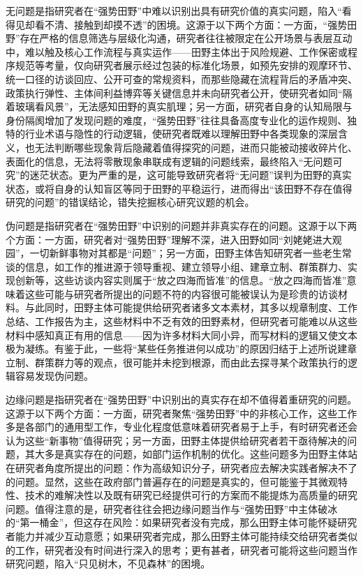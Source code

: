 \documentclass[12pt,a4paper]{article}
\begin{document}
无问题是指研究者在“强势田野”中难以识别出具有研究价值的真实问题，陷入“看得见却看不清、接触到却摸不透”的困境。这源于以下两个方面：一方面，“强势田野”存在严格的信息筛选与层级化沟通，研究者往往被限定在公开场景与表层互动中，难以触及核心工作流程与真实运作——田野主体出于风险规避、工作保密或程序规范等考量，仅向研究者展示经过包装的标准化场景，如预先安排的观摩环节、统一口径的访谈回应、公开可查的常规资料，而那些隐藏在流程背后的矛盾冲突、政策执行弹性、主体间利益博弈等关键信息并未向研究者公开，使研究者如同“隔着玻璃看风景”，无法感知田野的真实肌理；另一方面，研究者自身的认知局限与身份隔阂增加了发现问题的难度，“强势田野”往往具备高度专业化的运作规则、独特的行业术语与隐性的行动逻辑，使研究者既难以理解田野中各类现象的深层含义，也无法判断哪些现象背后隐藏着值得探究的问题，进而只能被动接收碎片化、表面化的信息，无法将零散现象串联成有逻辑的问题线索，最终陷入“无问题可究”的迷茫状态。更为严重的是，这可能导致研究者将“无问题”误判为田野的真实状态，或将自身的认知盲区等同于田野的平稳运行，进而得出“该田野不存在值得研究的问题”的错误结论，错失挖掘核心研究议题的机会。



伪问题是指研究者在“强势田野”中识别的问题并非真实存在的问题。这源于以下两个方面：一方面，研究者对“强势田野”理解不深，进入田野如同“刘姥姥进大观园”，一切新鲜事物对其都是“问题”；另一方面，田野主体告知研究者一些老生常谈的信息，如工作的推进源于领导重视、建立领导小组、建章立制、群策群力、实现创新等，这些访谈内容实则属于“放之四海而皆准”的信息。“放之四海而皆准”意味着这些可能与研究者所提出的问题不符的内容很可能被误认为是珍贵的访谈材料。与此同时，田野主体可能提供给研究者诸多文本素材，其多以规章制度、工作总结、工作报告为主，这些材料中不乏有效的田野素材，但研究者可能难以从这些材料中感知真正有用的信息——因为许多材料大同小异，而写材料的逻辑又使文本极为凝练。有鉴于此，一些将“某些任务推进何以成功”的原因归结于上述所说建章立制、群策群力等的观点，很可能并未挖到根源，而由此去探寻某个政策执行的逻辑容易发现伪问题。



边缘问题是指研究者在“强势田野”中识别出的真实存在却不值得着重研究的问题。这源于以下两个方面：一方面，研究者聚焦“强势田野”中的非核心工作，这些工作多是各部门的通用型工作，专业化程度低意味着研究者易于上手，有时研究者还会认为这些“新事物”值得研究；另一方面，田野主体提供给研究者若干亟待解决的问题，其大多是真实存在的问题，如部门运作机制的优化。这些问题多为田野主体站在研究者角度所提出的问题：作为高级知识分子，研究者应去解决实践者解决不了的问题。显然，这些在政府部门普遍存在的问题是真实的，但可能鉴于其微观特性、技术的难解决性以及既有研究已经提供可行的方案而不能提炼为高质量的研究问题。值得注意的是，研究者往往会把边缘问题当作与“强势田野”中主体破冰的“第一桶金”，但这存在风险：如果研究者没有完成，那么田野主体可能怀疑研究者能力并减少互动意愿；如果研究者完成，那么田野主体可能持续交给研究者类似的工作，研究者没有时间进行深入的思考；更有甚者，研究者可能将这些问题当作研究问题，陷入“只见树木，不见森林”的困境。
\end{document}
